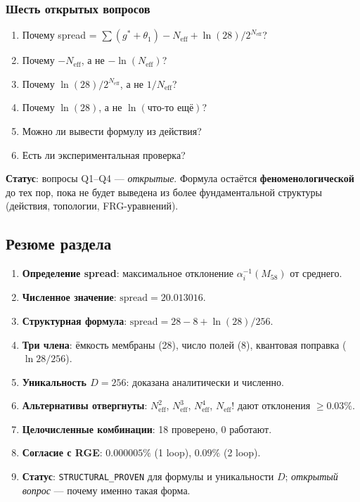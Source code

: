 \documentclass[11pt,a4paper]{article}
\theoremstyle{definition}
\begin{document}
\subsubsection{Шесть открытых вопросов}

\begin{enumerate}
    \item[Q1:] Почему spread = $\sum(g^* + \theta_1) - N_{\text{eff}}
          + \ln(28)/2^{N_{\text{eff}}}$?
    \item[Q2:] Почему $-N_{\text{eff}}$, а не $-\ln(N_{\text{eff}})$?
    \item[Q3:] Почему $\ln(28)/2^{N_{\text{eff}}}$, а не $1/N_{\text{eff}}$?
    \item[Q4:] Почему $\ln(28)$, а не $\ln(\text{что-то ещё})$?
    \item[Q5:] Можно ли вывести формулу из действия?
    \item[Q6:] Есть ли экспериментальная проверка?
\end{enumerate}

\medskip\noindent
\textbf{Статус}: вопросы Q1--Q4 --- \emph{открытые}.
Формула остаётся \textbf{феноменологической} до тех пор,
пока не будет выведена из более фундаментальной структуры
(действия, топологии, FRG-уравнений).

\subsection{Резюме раздела}
\label{subsec:spread-summary}

\begin{enumerate}
    \item \textbf{Определение spread}: максимальное отклонение
          $\alpha_i^{-1}(M_{58})$ от среднего.
    \item \textbf{Численное значение}: $\text{spread} = 20.013016$.
    \item \textbf{Структурная формула}:
          $\text{spread} = 28 - 8 + \ln(28)/256$.
    \item \textbf{Три члена}: ёмкость мембраны (28),
          число полей (8), квантовая поправка ($\ln 28/256$).
    \item \textbf{Уникальность $D = 256$}: доказана
          аналитически и численно.
    \item \textbf{Альтернативы отвергнуты}: $N_{\text{eff}}^2$,
          $N_{\text{eff}}^3$, $N_{\text{eff}}^4$, $N_{\text{eff}}!$
          дают отклонения $\geq 0.03\%$.
    \item \textbf{Целочисленные комбинации}: 18 проверено,
          0 работают.
    \item \textbf{Согласие с RGE}: $0.000005\%$ (1 loop),
          $0.09\%$ (2 loop).
    \item \textbf{Статус}: \texttt{STRUCTURAL\_PROVEN} для
          формулы и уникальности $D$; \emph{открытый вопрос} ---
          почему именно такая форма.
\end{enumerate}
\end{document}
